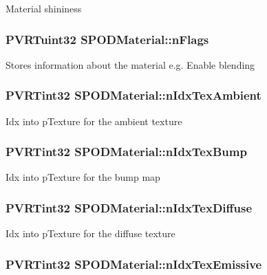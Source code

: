 Material shininess \hypertarget{struct_s_p_o_d_material_abb079c0fd2d2cfae1306dd1c68d4bb32}{
\subsubsection[{n\+Flags}]{\setlength{\rightskip}{0pt plus 5cm}P\+V\+R\+Tuint32 S\+P\+O\+D\+Material\+::n\+Flags}}\label{struct_s_p_o_d_material_abb079c0fd2d2cfae1306dd1c68d4bb32}
Stores information about the material e.\+g. Enable blending \hypertarget{struct_s_p_o_d_material_a10d850e51da352583f49549e12725bbe}{
\subsubsection[{n\+Idx\+Tex\+Ambient}]{\setlength{\rightskip}{0pt plus 5cm}P\+V\+R\+Tint32 S\+P\+O\+D\+Material\+::n\+Idx\+Tex\+Ambient}}\label{struct_s_p_o_d_material_a10d850e51da352583f49549e12725bbe}
Idx into p\+Texture for the ambient texture \hypertarget{struct_s_p_o_d_material_a01fcd39f070923111e8871dadfe16f40}{
\subsubsection[{n\+Idx\+Tex\+Bump}]{\setlength{\rightskip}{0pt plus 5cm}P\+V\+R\+Tint32 S\+P\+O\+D\+Material\+::n\+Idx\+Tex\+Bump}}\label{struct_s_p_o_d_material_a01fcd39f070923111e8871dadfe16f40}
Idx into p\+Texture for the bump map \hypertarget{struct_s_p_o_d_material_a6d795d80328d5dc9ae7018a76d487555}{
\subsubsection[{n\+Idx\+Tex\+Diffuse}]{\setlength{\rightskip}{0pt plus 5cm}P\+V\+R\+Tint32 S\+P\+O\+D\+Material\+::n\+Idx\+Tex\+Diffuse}}\label{struct_s_p_o_d_material_a6d795d80328d5dc9ae7018a76d487555}
Idx into p\+Texture for the diffuse texture \hypertarget{struct_s_p_o_d_material_a9dc45a1c21a01b2ab4ff957fb060c673}{
\subsubsection[{n\+Idx\+Tex\+Emissive}]{\setlength{\rightskip}{0pt plus 5cm}P\+V\+R\+Tint32 S\+P\+O\+D\+Material\+::n\+Idx\+Tex\+Emissive}}\label{struct_s_p_o_d_material_a9dc45a1c21a01b2ab4ff957fb060c673}
